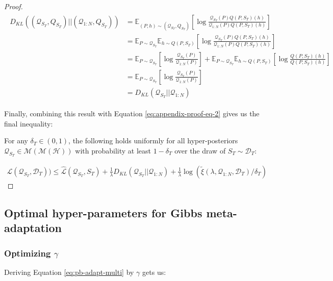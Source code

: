 \documentclass{article}
\theoremstyle{definition}
\newcommand{\Expect}[2]{\mathbb{E}_{#1}\left [#2 \right ]}
\begin{document}
\begin{proof}
	\begin{align*}
	\begin{split}
	D_{KL}((\mathcal{Q}_{S_T}, Q_{S_T})||(\mathcal{Q}_{1:N}, Q_{S_T}))&=\Expect{(P,h)\sim (\mathcal{Q}_{S_T},Q_{S_T})}{\log\frac{\mathcal{Q}_{S_T}(P)Q(P, S_T)(h)}{\mathcal{Q}_{1:N}(P)Q(P, S_T)(h)}}\\
	&=\mathbb{E}_{P\sim \mathcal{Q}_{S_T}}\Expect{h\sim Q(P,S_T)}{\log\frac{\mathcal{Q}_{S_T}(P)Q(P, S_T)(h)}{\mathcal{Q}_{1:N}(P)Q(P, S_T)(h)}}\\
	&=\Expect{P\sim \mathcal{Q}_{S_T}}{\log\frac{\mathcal{Q}_{S_T}(P)}{\mathcal{Q}_{1:N}(P)}}+\mathbb{E}_{P\sim \mathcal{Q}_{S_T}}\Expect{h\sim Q(P,S_T)}{\log\frac{Q(P, S_T)(h)}{Q(P, S_T)(h)}}\\
	&=\Expect{P\sim \mathcal{Q}_{S_T}}{\log\frac{\mathcal{Q}_{S_T}(P)}{\mathcal{Q}_{1:N}(P)}}\\
	&=D_{KL}(\mathcal{Q}_{S_T}||\mathcal{Q}_{1:N})
	\end{split}
	\end{align*}
	
	Finally, combining this result with Equation \ref{eq:appendix-proof-eq-2} gives us the final inequality:
	
	For any $\delta_T \in (0,1)$, the following holds uniformly for all hyper-posteriors $\mathcal{Q}_{S_T}\in \mathcal{M}(\mathcal{M}(\mathcal{H}))$ with probability at least $1-\delta_T$ over the draw of $S_T\sim \mathcal{D}_T$:
	
	\begin{align*}
	\mathcal{L}(\mathcal{Q}_{S_T}, \mathcal{D}_T)) \leq \hat{\mathcal{L}}(\mathcal{Q}_{S_T}, S_T) + \frac{1}{\lambda}D_{KL}(\mathcal{Q}_{S_T}||\mathcal{Q}_{1:N})
	+\frac{1}{\lambda}\log\left (\tilde{\xi}(\lambda,\mathcal{Q}_{1:N},\mathcal{D}_T)/\delta_T\right )
	\end{align*}
	\end{proof}

\subsection{Optimal hyper-parameters for Gibbs meta-adaptation} \label{append:optimiziation}

\subsubsection{Optimizing $\gamma$}

Deriving Equation \ref{eq:pb-adapt-multi} by $\gamma$ gets us:
\end{document}
